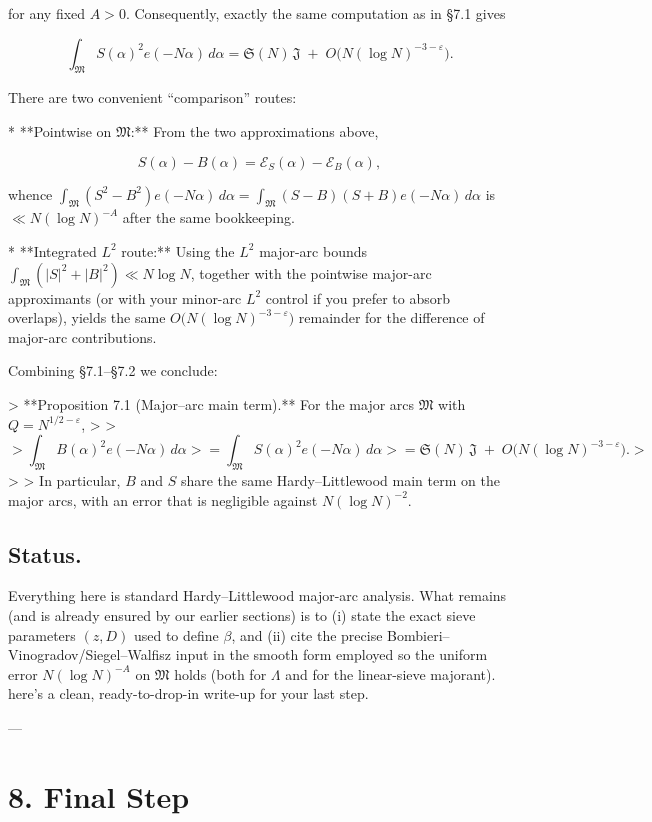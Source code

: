 \documentclass[11pt]{article}
\theoremstyle{definition}
\theoremstyle{remark}
\begin{document}
for any fixed $A>0$. Consequently, exactly the same computation as in §7.1 gives

$$
\int_{\mathfrak M} S(\alpha)^2 e(-N\alpha)\,d\alpha
=\mathfrak S(N)\,\mathfrak J\;+\;O\!\big(N(\log N)^{-3-\varepsilon}\big).
$$

There are two convenient “comparison” routes:

* **Pointwise on $\mathfrak M$:** From the two approximations above,

  $$
  S(\alpha)-B(\alpha)=\mathcal E_S(\alpha)-\mathcal E_B(\alpha),
  $$

  whence $\int_{\mathfrak M}(S^2-B^2)e(-N\alpha)\,d\alpha =\int_{\mathfrak M}(S-B)(S+B)e(-N\alpha)\,d\alpha$
  is $\ll N(\log N)^{-A}$ after the same bookkeeping.

* **Integrated $L^2$ route:** Using the $L^2$ major-arc bounds $\int_{\mathfrak M}(|S|^2+|B|^2)\ll N\log N$, together with the pointwise major-arc approximants (or with your minor-arc $L^2$ control if you prefer to absorb overlaps), yields the same $O\big(N(\log N)^{-3-\varepsilon}\big)$ remainder for the difference of major-arc contributions.

Combining §7.1–§7.2 we conclude:

> **Proposition 7.1 (Major–arc main term).** For the major arcs $\mathfrak M$ with $Q=N^{1/2-\varepsilon}$,
>
> $$
> \int_{\mathfrak M} B(\alpha)^2 e(-N\alpha)\,d\alpha
> =\int_{\mathfrak M} S(\alpha)^2 e(-N\alpha)\,d\alpha
> =\mathfrak S(N)\,\mathfrak J\;+\;O\!\big(N(\log N)^{-3-\varepsilon}\big).
> $$
>
> In particular, $B$ and $S$ share the same Hardy–Littlewood main term on the major arcs, with an error that is negligible against $N(\log N)^{-2}$.

\subsection*{Status.} 
Everything here is standard Hardy–Littlewood major-arc analysis. What remains (and is already ensured by our earlier sections) is to (i) state the exact sieve parameters $(z,D)$ used to define $\beta$, and (ii) cite the precise Bombieri–Vinogradov/Siegel–Walfisz input in the smooth form employed so the uniform error $N(\log N)^{-A}$ on $\mathfrak M$ holds (both for $\Lambda$ and for the linear-sieve majorant).
here’s a clean, ready-to-drop-in write-up for your last step.

---

\section*{8. Final Step}
\end{document}
